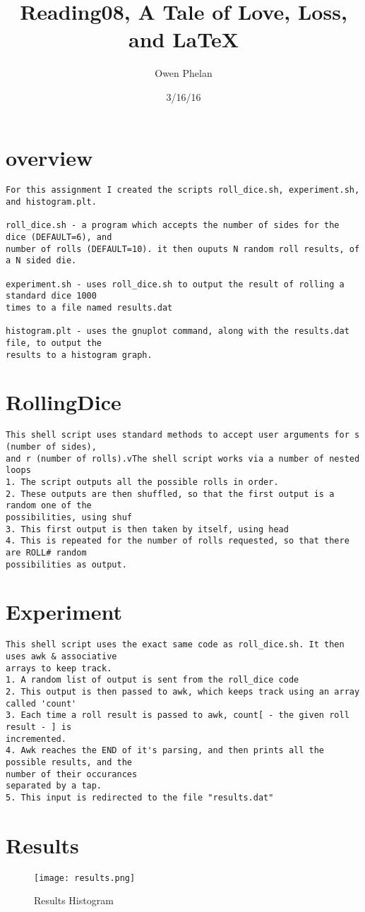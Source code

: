 \documentclass{article}
\title{Reading08, A Tale of Love, Loss, and LaTeX}
\date{3/16/16}
\author{Owen Phelan}
\begin{document}
	\maketitle
	\section{overview}
	\begin{verbatim}
For this assignment I created the scripts roll_dice.sh, experiment.sh, and histogram.plt.

roll_dice.sh - a program which accepts the number of sides for the dice (DEFAULT=6), and 
number of rolls (DEFAULT=10). it then ouputs N random roll results, of a N sided die.

experiment.sh - uses roll_dice.sh to output the result of rolling a standard dice 1000 
times to a file named results.dat

histogram.plt - uses the gnuplot command, along with the results.dat file, to output the 
results to a histogram graph.
	\end{verbatim}
	\section{RollingDice}
	\begin{verbatim}
This shell script uses standard methods to accept user arguments for s (number of sides), 
and r (number of rolls).vThe shell script works via a number of nested loops
1. The script outputs all the possible rolls in order. 
2. These outputs are then shuffled, so that the first output is a random one of the 
possibilities, using shuf
3. This first output is then taken by itself, using head
4. This is repeated for the number of rolls requested, so that there are ROLL# random 
possibilities as output.
	\end{verbatim}
	\section{Experiment}
	\begin{verbatim}
This shell script uses the exact same code as roll_dice.sh. It then uses awk & associative 
arrays to keep track.
1. A random list of output is sent from the roll_dice code
2. This output is then passed to awk, which keeps track using an array called 'count'
3. Each time a roll result is passed to awk, count[ - the given roll result - ] is 
incremented.
4. Awk reaches the END of it's parsing, and then prints all the possible results, and the 
number of their occurances
separated by a tap.
5. This input is redirected to the file "results.dat"
	\end{verbatim}
	\section{Results}
	\begin{figure}[h!]
	\centering
	\texttt{[image: results.png]}
	\caption{Results Histogram}
	\end{figure}
	\newpage
\end{document}
